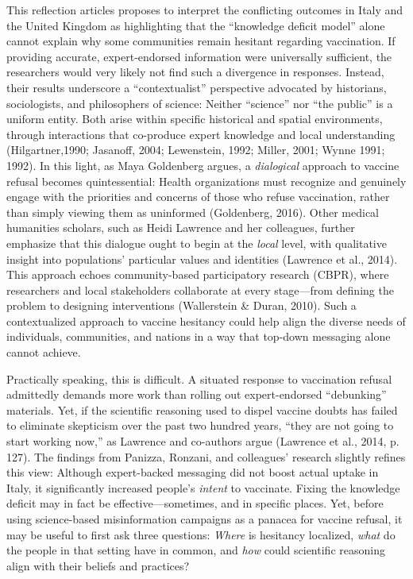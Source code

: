 \documentclass[authordate, empirical]{jote-new-article}
\begin{document}
	This reflection articles proposes to interpret the conflicting outcomes in Italy and the United Kingdom as highlighting that the “knowledge deficit model” alone cannot explain why some communities remain hesitant regarding vaccination. If providing accurate, expert-endorsed information were universally sufficient, the researchers would very likely not find such a divergence in responses. Instead, their results underscore a “contextualist” perspective advocated by historians, sociologists, and philosophers of science: Neither “science” nor “the public” is a uniform entity. Both arise within specific historical and spatial environments, through interactions that co-produce expert knowledge and local understanding (Hilgartner,1990; Jasanoff, 2004; Lewenstein, 1992; Miller, 2001; Wynne 1991; 1992). In this light, as Maya Goldenberg argues, a \emph{dialogical} approach to vaccine refusal becomes quintessential: Health organizations must recognize and genuinely engage with the priorities and concerns of those who refuse vaccination, rather than simply viewing them as uninformed (Goldenberg, 2016). Other medical humanities scholars, such as Heidi Lawrence and her colleagues, further emphasize that this dialogue ought to begin at the \emph{local} level, with qualitative insight into populations' particular values and identities (Lawrence et al., 2014). This approach echoes community-based participatory research (CBPR), where researchers and local stakeholders collaborate at every stage—from defining the problem to designing interventions (Wallerstein \& Duran, 2010). Such a contextualized approach to vaccine hesitancy could help align the diverse needs of individuals, communities, and nations in a way that top-down messaging alone cannot achieve.







	Practically speaking, this is difficult. A situated response to vaccination refusal admittedly demands more work than rolling out expert-endorsed “debunking” materials. Yet, if the scientific reasoning used to dispel vaccine doubts has failed to eliminate skepticism over the past two hundred years, “they are not going to start working now,” as Lawrence and co-authors argue (Lawrence et al., 2014, p. 127). The findings from Panizza, Ronzani, and colleagues' research slightly refines this view: Although expert-backed messaging did not boost actual uptake in Italy, it significantly increased people's \emph{intent} to vaccinate. Fixing the knowledge deficit may in fact be effective—sometimes, and in specific places. Yet, before using science-based misinformation campaigns as a panacea for vaccine refusal, it may be useful to first ask three questions: \emph{Where} is hesitancy localized, \emph{what} do the people in that setting have in common, and \emph{how} could scientific reasoning align with their beliefs and practices?
\end{document}
